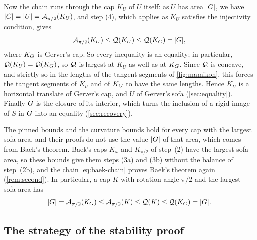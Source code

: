 Now the chain runs through the cap $K_U$ of $U$ itself: as $U$ has area
$\lvert G\rvert$, we have $\lvert G\rvert=\lvert U\rvert=\mathcal{A}_{\pi/2}(K_U)$, and step (4), which
applies as $K_U$ satisfies the injectivity condition, gives
\[
  \mathcal{A}_{\pi/2}(K_U)\le\mathcal{Q}(K_U)\le\mathcal{Q}(K_G)=\lvert G\rvert ,
\]
where $K_G$ is Gerver's cap.
So every inequality is an equality; in particular, $\mathcal{Q}(K_U)=\mathcal{Q}(K_G)$, so $\mathcal{Q}$
is largest at $K_U$ as well as at $K_G$. Since $\mathcal{Q}$ is concave, and strictly so
in the lengths of the tangent segments of \cref{fig:mamikon}, this forces the
tangent segments of $K_U$ and of $K_G$ to have the same lengths. Hence $K_U$ is
a horizontal translate of Gerver's cap, and $U$ of Gerver's sofa
(\cref{sec:equality}). Finally $G$ is the closure of its interior, which turns
the inclusion of a rigid image of $S$ in $G$ into an equality
(\cref{sec:recovery}).

 The pinned bounds and the curvature
bounds hold for every cap with the largest sofa area, and their proofs do not
use the value $\lvert G\rvert$ of that area, which comes from Baek's theorem. Baek's
caps $K_\omega$ and $K_{\pi/2}$ of step~(2) have the largest sofa area, so these
bounds give them steps (3a) and (3b) without the balance of step~(2b), and the
chain \eqref{eq:baek-chain} proves Baek's theorem again (\cref{rem:second}). In
particular, a cap $K$ with rotation angle $\pi/2$ and the largest sofa area has
\begin{equation}\label{eq:second-chain}
  \lvert G\rvert=\mathcal{A}_{\pi/2}(K_G)\le\mathcal{A}_{\pi/2}(K)\le\mathcal{Q}(K)\le\mathcal{Q}(K_G)=\lvert G\rvert .
\end{equation}

\subsection{The strategy of the stability proof}\label{sec:strategy-stability}

